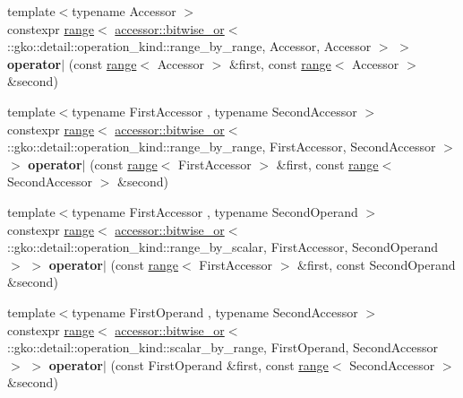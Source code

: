 \begin{DoxyCompactItemize}
\item 
\mbox{\label{namespacegko_aa83739f5164d2c071abe69bb4fb89203}} 
{\footnotesize template$<$typename Accessor $>$ }\\constexpr \hyperlink{classgko_1_1range}{range}$<$ \hyperlink{structgko_1_1accessor_1_1bitwise__or}{accessor\+::bitwise\+\_\+or}$<$ \+::gko\+::detail\+::operation\+\_\+kind\+::range\+\_\+by\+\_\+range, Accessor, Accessor $>$ $>$ {\bfseries operator$\vert$} (const \hyperlink{classgko_1_1range}{range}$<$ Accessor $>$ \&first, const \hyperlink{classgko_1_1range}{range}$<$ Accessor $>$ \&second)
\item 
\mbox{\label{namespacegko_ab4bc92ac2122a4fc41a92003bfaf9c4c}} 
{\footnotesize template$<$typename First\+Accessor , typename Second\+Accessor $>$ }\\constexpr \hyperlink{classgko_1_1range}{range}$<$ \hyperlink{structgko_1_1accessor_1_1bitwise__or}{accessor\+::bitwise\+\_\+or}$<$ \+::gko\+::detail\+::operation\+\_\+kind\+::range\+\_\+by\+\_\+range, First\+Accessor, Second\+Accessor $>$ $>$ {\bfseries operator$\vert$} (const \hyperlink{classgko_1_1range}{range}$<$ First\+Accessor $>$ \&first, const \hyperlink{classgko_1_1range}{range}$<$ Second\+Accessor $>$ \&second)
\item 
\mbox{\label{namespacegko_aa8261b7cf1c5356d8acd690cf6da78ae}} 
{\footnotesize template$<$typename First\+Accessor , typename Second\+Operand $>$ }\\constexpr \hyperlink{classgko_1_1range}{range}$<$ \hyperlink{structgko_1_1accessor_1_1bitwise__or}{accessor\+::bitwise\+\_\+or}$<$ \+::gko\+::detail\+::operation\+\_\+kind\+::range\+\_\+by\+\_\+scalar, First\+Accessor, Second\+Operand $>$ $>$ {\bfseries operator$\vert$} (const \hyperlink{classgko_1_1range}{range}$<$ First\+Accessor $>$ \&first, const Second\+Operand \&second)
\item 
\mbox{\label{namespacegko_af5919cbe46045874ae714655dadf21f7}} 
{\footnotesize template$<$typename First\+Operand , typename Second\+Accessor $>$ }\\constexpr \hyperlink{classgko_1_1range}{range}$<$ \hyperlink{structgko_1_1accessor_1_1bitwise__or}{accessor\+::bitwise\+\_\+or}$<$ \+::gko\+::detail\+::operation\+\_\+kind\+::scalar\+\_\+by\+\_\+range, First\+Operand, Second\+Accessor $>$ $>$ {\bfseries operator$\vert$} (const First\+Operand \&first, const \hyperlink{classgko_1_1range}{range}$<$ Second\+Accessor $>$ \&second)

\end{DoxyCompactItemize}

